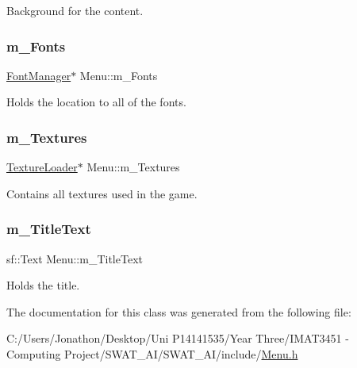 Background for the content. 

\mbox{\label{class_menu_ac973d7706422e159a9447fa0655d2666}} 
\subsubsection{\texorpdfstring{m\+\_\+\+Fonts}{m\_Fonts}}
{\footnotesize\ttfamily \hyperlink{class_font_manager}{Font\+Manager}$\ast$ Menu\+::m\+\_\+\+Fonts\hspace{0.3cm}{\ttfamily [private]}}



Holds the location to all of the fonts. 

\mbox{\label{class_menu_a05b6e122a40964ee105c2519f8593659}} 
\subsubsection{\texorpdfstring{m\+\_\+\+Textures}{m\_Textures}}
{\footnotesize\ttfamily \hyperlink{class_texture_loader}{Texture\+Loader}$\ast$ Menu\+::m\+\_\+\+Textures\hspace{0.3cm}{\ttfamily [private]}}



Contains all textures used in the game. 

\mbox{\label{class_menu_a80fcab309ad59f745961adaabf689372}} 
\subsubsection{\texorpdfstring{m\+\_\+\+Title\+Text}{m\_TitleText}}
{\footnotesize\ttfamily sf\+::\+Text Menu\+::m\+\_\+\+Title\+Text\hspace{0.3cm}{\ttfamily [private]}}



Holds the title. 



The documentation for this class was generated from the following file\+:\begin{DoxyCompactItemize}
\item 
C\+:/\+Users/\+Jonathon/\+Desktop/\+Uni P14141535/\+Year Three/\+I\+M\+A\+T3451 -\/ Computing Project/\+S\+W\+A\+T\+\_\+\+A\+I/\+S\+W\+A\+T\+\_\+\+A\+I/include/\hyperlink{_menu_8h}{Menu.\+h}\end{DoxyCompactItemize}
